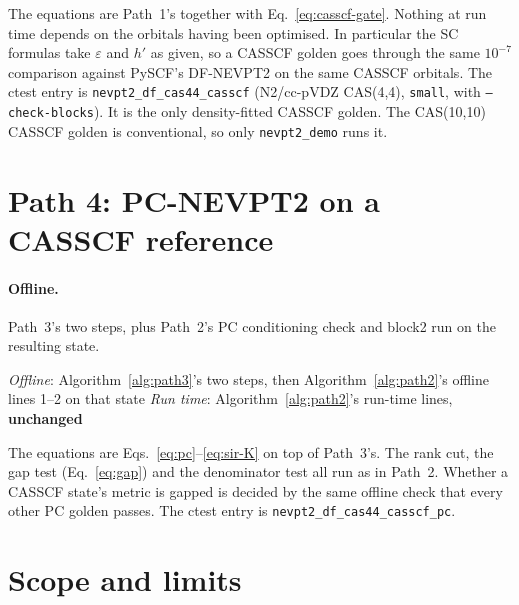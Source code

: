 \documentclass[11pt]{article}
\newcommand{\code}[1]{\texttt{#1}}
\newcommand{\eps}{\varepsilon}
\begin{document}
The equations are Path~1's together with Eq.~\eqref{eq:casscf-gate}. Nothing at run time
depends on the orbitals having been optimised. In particular the SC
formulas take $\eps$ and $h'$ as given, so a CASSCF golden goes through the
same $10^{-7}$ comparison against PySCF's DF-NEVPT2 on the same CASSCF
orbitals. The ctest entry is \code{nevpt2\_df\_cas44\_casscf} (N2/cc-pVDZ
CAS(4,4), \code{small}, with \code{--check-blocks}). It is the only
density-fitted CASSCF golden. The CAS(10,10) CASSCF golden is conventional,
so only \code{nevpt2\_demo} runs it.

\section{Path 4: PC-NEVPT2 on a CASSCF reference}
\label{sec:pc-casscf}

\paragraph{Offline.} Path~3's two steps, plus Path~2's PC conditioning check
and block2 run on the resulting state.

\begin{algorithm}[htbp]
\caption{Path 4, PC on CASSCF orbitals}
\label{alg:path4}
\begin{algorithmic}[1]
\Statex \textit{Offline}: Algorithm~\ref{alg:path3}'s two steps, then Algorithm~\ref{alg:path2}'s offline lines 1--2 on that state
\Statex \textit{Run time}: Algorithm~\ref{alg:path2}'s run-time lines, \textbf{unchanged}
\end{algorithmic}
\end{algorithm}

The equations are Eqs.~\eqref{eq:pc}--\eqref{eq:sir-K} on top of Path~3's.
The rank cut, the gap test (Eq.~\eqref{eq:gap}) and the denominator test
all run as in Path~2. Whether a CASSCF state's metric is gapped is decided by
the same offline check that every other PC golden passes. The ctest entry is
\code{nevpt2\_df\_cas44\_casscf\_pc}.

\section{Scope and limits}
\label{sec:limits}
\end{document}
